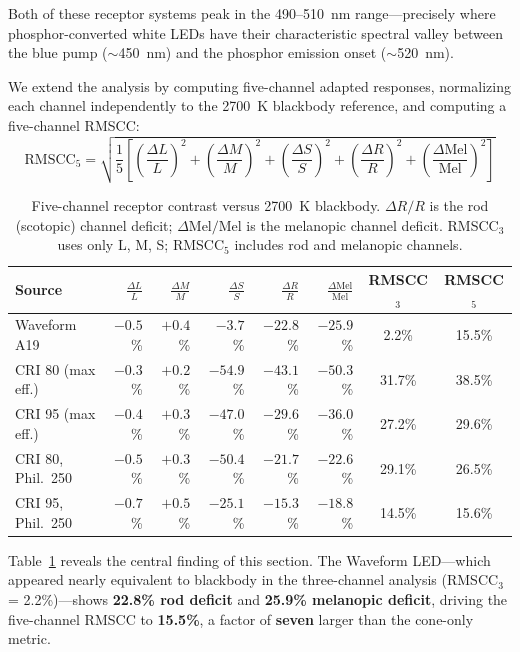 \documentclass[11pt]{article}
\begin{document}
Both of these receptor systems peak in the 490--510~nm range---precisely
where phosphor-converted white LEDs have their characteristic spectral
valley between the blue pump ($\sim$450~nm) and the phosphor emission
onset ($\sim$520~nm).

We extend the analysis by computing five-channel adapted responses,
normalizing each channel independently to the 2700~K blackbody reference,
and computing a five-channel RMSCC:
\[
\text{RMSCC}_5 = \sqrt{\frac{1}{5}\left[
\left(\frac{\Delta L}{L}\right)^2 +
\left(\frac{\Delta M}{M}\right)^2 +
\left(\frac{\Delta S}{S}\right)^2 +
\left(\frac{\Delta R}{R}\right)^2 +
\left(\frac{\Delta \text{Mel}}{\text{Mel}}\right)^2
\right]}
\]

\begin{table}[h]
\centering
\small
\caption{Five-channel receptor contrast versus 2700~K blackbody.
$\Delta R/R$ is the rod (scotopic) channel deficit; $\Delta\text{Mel}/\text{Mel}$
is the melanopic channel deficit.  RMSCC$_3$ uses only L, M, S;
RMSCC$_5$ includes rod and melanopic channels.}
\label{tab:5ch-contrast}
\begin{tabular}{lrrrrrcc}
\toprule
Source & $\frac{\Delta L}{L}$ & $\frac{\Delta M}{M}$ & $\frac{\Delta S}{S}$
       & $\frac{\Delta R}{R}$ & $\frac{\Delta\text{Mel}}{\text{Mel}}$
       & RMSCC$_3$ & RMSCC$_5$ \\
\midrule
Waveform A19         & $-0.5$\% & $+0.4$\% & $-3.7$\%  & $-22.8$\%  & $-25.9$\%  & 2.2\%  & 15.5\% \\
CRI 80 (max eff.)    & $-0.3$\% & $+0.2$\% & $-54.9$\% & $-43.1$\%  & $-50.3$\%  & 31.7\% & 38.5\% \\
CRI 95 (max eff.)    & $-0.4$\% & $+0.3$\% & $-47.0$\% & $-29.6$\%  & $-36.0$\%  & 27.2\% & 29.6\% \\
CRI 80, Phil.\ 250   & $-0.5$\% & $+0.3$\% & $-50.4$\% & $-21.7$\%  & $-22.6$\%  & 29.1\% & 26.5\% \\
CRI 95, Phil.\ 250   & $-0.7$\% & $+0.5$\% & $-25.1$\% & $-15.3$\%  & $-18.8$\%  & 14.5\% & 15.6\% \\
\bottomrule
\end{tabular}
\end{table}

Table~\ref{tab:5ch-contrast} reveals the central finding of this section.
The Waveform LED---which appeared nearly equivalent to blackbody in the
three-channel analysis (RMSCC$_3$ = 2.2\%)---shows \textbf{22.8\% rod
deficit} and \textbf{25.9\% melanopic deficit}, driving the five-channel
RMSCC to \textbf{15.5\%}, a factor of \textbf{seven} larger than the
cone-only metric.
\end{document}
